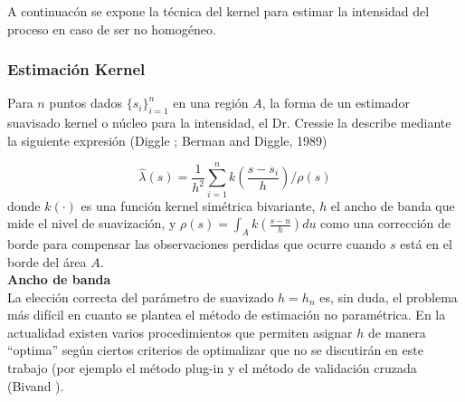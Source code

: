 \documentclass[12pt]{report}
\begin{document}
		
	A continuacón se expone la técnica del kernel para estimar la intensidad del proceso en caso de ser no homogéneo. 
	
		
	
		
		
		
		
	
		
		
		\subsubsection{Estimación Kernel} \label{Kernel}
		
		
		Para  $n $ puntos dados  $ \{s_{i}\}^{n}_{i=1}$ en una región $A$, la forma de un estimador suavisado  kernel o núcleo para la intensidad,  el Dr. Cressie la describe mediante la siguiente expresión (Diggle \cite{Diggle}; Berman and Diggle, 1989)
		
		\[ \widehat{\lambda}(s)  = \frac{1}{ h^{2} } \sum_{i=1}^{n} k( \frac{ s -  s_{i}  }{h} )/\rho(s) \]  donde $ k ( \cdot ) $  es una función kernel simétrica bivariante,  $h$ el ancho de banda que  mide el nivel de suavización, y $ \rho(s) = \int_{A} k( \frac{ s -  u} {h}) du $ como una corrección de borde para compensar las observaciones perdidas que ocurre cuando $s$ está en el borde del área $A$. \\  
			

			{\bf{Ancho de banda}}\\  
			
	La elección correcta del parámetro de suavizado  $ h = h_{ n }$  es, sin duda, el problema más difícil en cuanto se plantea el método de estimación no paramétrica. En la actualidad existen varios procedimientos que permiten asignar $h$ de manera “optima” según  ciertos criterios de optimalizar que no se discutirán  en este trabajo (por ejemplo el método plug-in y
	el método de validación cruzada (Bivand  \cite{Roger}). 	
	
		 
 	
		 
		
\end{document}
